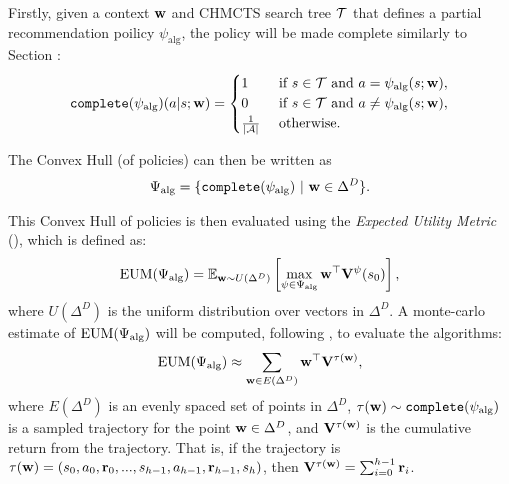         Firstly, given a context $\mathbf{w}$ and CHMCTS search tree $\mathcal{T}$ that defines a partial recommendation poilicy $\psi_{\text{alg}}$, the policy will be made complete similarly to Section :
        \begin{align}
            \texttt{complete}(\psi_{\text{alg}})(a|s;\mathbf{w}) =
            \begin{cases}
                1                       & \text{ if } s\in\mathcal{T} \text{ and } a=\psi_{\text{alg}}(s;\mathbf{w}), \\
                0                       & \text{ if } s\in\mathcal{T} \text{ and } a\neq\psi_{\text{alg}}(s;\mathbf{w}), \\
                \frac{1}{|\mathcal{A}|}      & \text{ otherwise.}
            \end{cases} \label{eq:full_Recommend}
        \end{align}

        The Convex Hull (of policies) can then be written as 
        \begin{align}
            \Psi_{\text{alg}} = \{\texttt{complete}(\psi_{\text{alg}})\ |\ \bff{w}\in\Delta^D \}.
        \end{align}

        This Convex Hull of policies is then evaluated using the \textit{Expected Utility Metric} (\eum), which is defined as:
        \begin{align}
            {\textnormal{EUM}}(\Psi_{\text{alg}}) = \mathbb{E}_{\mathbf{w}\sim U(\Delta^D)}\left[
                \max_{\psi\in\Psi_{\text{alg}}} \mathbf{w}^\top \mathbf{V}^{\psi}(s_0)
             \right],
        \end{align}
        where $U(\Delta^D)$ is the uniform distribution over vectors in $\Delta^D$. A monte-carlo estimate of ${\textnormal{EUM}}(\Psi_{\text{alg}})$ will be computed, following , to evaluate the algorithms:
        \begin{align}
            {\textnormal{EUM}}(\Psi_{\text{alg}}) \approx \sum_{\mathbf{w}\in E(\Delta^D)} \mathbf{w}^\top \mathbf{V}^{\tau(\mathbf{w})},
        \end{align}
        where $E(\Delta^D)$ is an evenly spaced set of points in $\Delta^D$, $\tau(\mathbf{w}) \sim \texttt{complete}(\psi_{\text{alg}})$ is a sampled trajectory for the point $\mathbf{w}\in\Delta^D$, and $\mathbf{V}^{\tau(\mathbf{w})}$ is the cumulative return from the trajectory. That is, if  the trajectory is $\tau(\mathbf{w})=(s_0,a_0,\mathbf{r}_0,...,s_{h-1},a_{h-1},\mathbf{r}_{h-1},s_h)$, then $\mathbf{V}^{\tau(\mathbf{w})} = \sum_{i=0}^{h-1} \mathbf{r}_i$.

